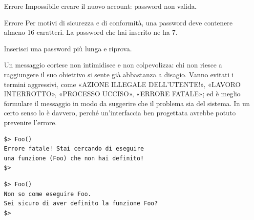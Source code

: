 \begin{center}
\begin{minipage}[t]{0.36\linewidth}\centering
  \begin{finestra}{Errore}
    Impossibile creare il nuovo account: password non valida.
  \end{finestra}\par\smallskip\male
\end{minipage}\hspace{0.06\linewidth}%
\begin{minipage}[t]{0.4\linewidth}\centering
  \begin{finestra}{Errore}
    Per motivi di sicurezza e di conformità, una password deve contenere almeno 16 caratteri. La password che hai
    inserito ne ha 7.\par\smallskip
    Inserisci una password più lunga e riprova.
  \end{finestra}\par\smallskip\bene
\end{minipage}
\end{center}

Un messaggio cortese non intimidisce e non colpevolizza: chi non riesce a raggiungere il suo obiettivo si sente già
abbastanza a disagio. Vanno evitati i termini aggressivi, come «AZIONE ILLEGALE DELL'UTENTE!», «LAVORO INTERROTTO»,
«PROCESSO UCCISO», «ERRORE FATALE»; ed è meglio formulare il messaggio in modo da suggerire che il problema sia del
sistema. In un certo senso lo è davvero, perché un'interfaccia ben progettata avrebbe potuto prevenire l'errore.

\begin{center}
\begin{minipage}[t]{0.42\linewidth}
\begin{lstlisting}[style=plain, name=Interprete]
$> Foo()
Errore fatale! Stai cercando di eseguire
una funzione (Foo) che non hai definito!
$>
\end{lstlisting}
\centering\male
\end{minipage}\hspace{0.06\linewidth}%
\begin{minipage}[t]{0.42\linewidth}
\begin{lstlisting}[style=plain, name=Interprete]
$> Foo()
Non so come eseguire Foo.
Sei sicuro di aver definito la funzione Foo?
$>
\end{lstlisting}
\centering\bene
\end{minipage}
\end{center}

